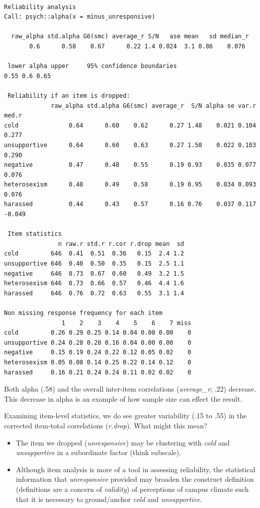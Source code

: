 \documentclass[
  english,
]{book}
\providecommand{\tightlist}{%
  \setlength{\itemsep}{0pt}\setlength{\parskip}{0pt}}
\begin{document}
\begin{verbatim}

Reliability analysis   
Call: psych::alpha(x = minus_unresponsive)

  raw_alpha std.alpha G6(smc) average_r S/N   ase mean   sd median_r
       0.6      0.58    0.67      0.22 1.4 0.024  3.1 0.86    0.076

 lower alpha upper     95% confidence boundaries
0.55 0.6 0.65 

 Reliability if an item is dropped:
             raw_alpha std.alpha G6(smc) average_r  S/N alpha se var.r  med.r
cold              0.64      0.60    0.62      0.27 1.48    0.021 0.104  0.277
unsupportive      0.64      0.60    0.63      0.27 1.50    0.022 0.103  0.290
negative          0.47      0.48    0.55      0.19 0.93    0.035 0.077  0.076
heterosexism      0.48      0.49    0.58      0.19 0.95    0.034 0.093  0.076
harassed          0.44      0.43    0.57      0.16 0.76    0.037 0.117 -0.049

 Item statistics 
               n raw.r std.r r.cor r.drop mean  sd
cold         646  0.41  0.51  0.36   0.15  2.4 1.2
unsupportive 646  0.40  0.50  0.35   0.15  2.5 1.1
negative     646  0.73  0.67  0.60   0.49  3.2 1.5
heterosexism 646  0.73  0.66  0.57   0.46  4.4 1.6
harassed     646  0.76  0.72  0.63   0.55  3.1 1.4

Non missing response frequency for each item
                1    2    3    4    5    6    7 miss
cold         0.26 0.29 0.25 0.14 0.04 0.00 0.00    0
unsupportive 0.24 0.28 0.28 0.16 0.04 0.00 0.00    0
negative     0.15 0.19 0.24 0.22 0.12 0.05 0.02    0
heterosexism 0.05 0.08 0.14 0.25 0.22 0.14 0.12    0
harassed     0.16 0.21 0.24 0.24 0.11 0.02 0.02    0
\end{verbatim}

Both alpha (.58) and the overall inter-item correlations (\emph{average\_r}; .22) decrease. This decrease in alpha is an example of how sample size can effect the result.

Examining item-level statistics, we do see greater variability (.15 to .55) in the corrected item-total correlations (\emph{r.drop}). What might this mean?

\begin{itemize}
\tightlist
\item
  The item we dropped (\emph{unresponsive}) may be clustering with \emph{cold} and \emph{unsupportive} in a subordinate factor (think subscale).
\item
  Although item analysis is more of a tool in assessing reliability, the statistical information that \emph{unresponsive} provided may broaden the construct definition (definitions are a concern of \emph{validity}) of perceptions of campus climate such that it is necessary to ground/anchor \emph{cold} and \emph{unsupportive}.
\end{itemize}
\end{document}
